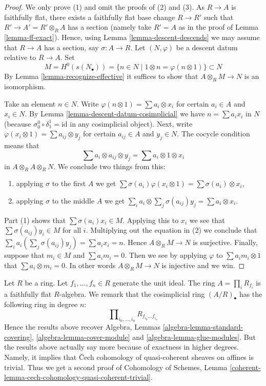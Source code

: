\begin{proof}
We only prove (1) and omit the proofs of (2) and (3).
As $R \to A$ is faithfully flat, there exists a faithfully flat
base change $R \to R'$ such that $R' \to A' = R' \otimes_R A$ has
a section (namely take $R' = A$ as in the proof of
Lemma \ref{lemma-ff-exact}). Hence, using
Lemma \ref{lemma-descent-descends}
we may assume that $R \to A$ has a section, say $\sigma : A \to R$.
Let $(N, \varphi)$ be a descent datum relative to $R \to A$.
Set
$$
M = H^0(s(N_\bullet)) = \{n \in N \mid 1 \otimes n = \varphi(n \otimes 1)\}
\subset
N
$$
By Lemma \ref{lemma-recognize-effective} it suffices to show that
$A \otimes_R M \to N$ is an isomorphism.

\medskip\noindent
Take an element $n \in N$. Write
$\varphi(n \otimes 1) = \sum a_i \otimes x_i$ for certain
$a_i \in A$ and $x_i \in N$. By Lemma \ref{lemma-descent-datum-cosimplicial}
we have $n = \sum a_i x_i$ in $N$ (because
$\sigma^0_0 \circ \delta^1_1 = \text{id}$ in any cosimplicial object).
Next, write $\varphi(x_i \otimes 1) = \sum a_{ij} \otimes y_j$ for
certain $a_{ij} \in A$ and $y_j \in N$.
The cocycle condition means that
$$
\sum a_i \otimes a_{ij} \otimes y_j = \sum a_i \otimes 1 \otimes x_i
$$
in $A \otimes_R A \otimes_R N$. We conclude two things from this:
\begin{enumerate}
\item applying $\sigma$ to the first $A$ we get
$\sum \sigma(a_i) \varphi(x_i \otimes 1) = \sum \sigma(a_i) \otimes x_i$,
\item applying $\sigma$ to the middle $A$ we get
$\sum_i a_i \otimes \sum_j \sigma(a_{ij}) y_j = \sum a_i \otimes x_i$.
\end{enumerate}
Part (1) shows that $\sum \sigma(a_i) x_i \in M$. Applying this to
$x_i$ we see that $\sum \sigma(a_{ij})y_i \in M$ for all $i$.
Multiplying out the equation in (2) we conclude that
$\sum_i a_i (\sum_j \sigma(a_{ij}) y_j) = \sum a_i x_i = n$.
Hence $A \otimes_R M \to N$ is surjective.
Finally, suppose that $m_i \in M$ and $\sum a_i m_i = 0$.
Then we see by applying $\varphi$ to
$\sum a_im_i \otimes 1$ that $\sum a_i \otimes m_i = 0$.
In other words $A \otimes_R M \to N$ is injective and we win.
\end{proof}

\begin{remark}
\label{remark-standard-covering}
Let $R$ be a ring. Let $f_1, \ldots, f_n\in R$ generate the
unit ideal. The ring $A = \prod_i R_{f_i}$ is a faithfully flat
$R$-algebra. We remark that the cosimplicial ring $(A/R)_\bullet$
has the following ring in degree $n$:
$$
\prod\nolimits_{i_0, \ldots, i_n} R_{f_{i_0}\ldots f_{i_n}}
$$
Hence the results above recover
Algebra, Lemmas \ref{algebra-lemma-standard-covering},
\ref{algebra-lemma-cover-module} and \ref{algebra-lemma-glue-modules}.
But the results above actually say more because of exactness
in higher degrees. Namely, it implies that {\v C}ech cohomology of
quasi-coherent sheaves on affines is trivial. Thus we get a second
proof of Cohomology of Schemes, Lemma
\ref{coherent-lemma-cech-cohomology-quasi-coherent-trivial}.
\end{remark}

